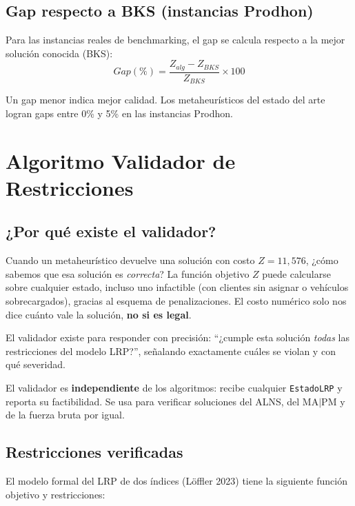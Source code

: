 \documentclass[12pt,a4paper]{article}
\begin{document}
\subsection{Gap respecto a BKS (instancias Prodhon)}

Para las instancias reales de benchmarking, el gap se calcula respecto a la mejor solución conocida (BKS):
$$Gap(\%) = \frac{Z_{alg} - Z_{BKS}}{Z_{BKS}} \times 100$$

Un gap menor indica mejor calidad. Los metaheurísticos del estado del arte logran gaps entre 0\% y 5\% en las instancias Prodhon.

\section{Algoritmo Validador de Restricciones}

\subsection{¿Por qué existe el validador?}

Cuando un metaheurístico devuelve una solución con costo $Z = 11{,}576$, ¿cómo sabemos que esa solución es \emph{correcta}? La función objetivo $Z$ puede calcularse sobre cualquier estado, incluso uno infactible (con clientes sin asignar o vehículos sobrecargados), gracias al esquema de penalizaciones. El costo numérico solo nos dice cuánto vale la solución, \textbf{no si es legal}.

El validador existe para responder con precisión: ``¿cumple esta solución \textit{todas} las restricciones del modelo LRP?'', señalando exactamente cuáles se violan y con qué severidad.

\begin{nota}
El validador es \textbf{independiente} de los algoritmos: recibe cualquier \texttt{EstadoLRP} y reporta su factibilidad. Se usa para verificar soluciones del ALNS, del MA$|$PM y de la fuerza bruta por igual.
\end{nota}

\subsection{Restricciones verificadas}

El modelo formal del LRP de dos índices (Löffler 2023) tiene la siguiente función objetivo y restricciones:
\end{document}
